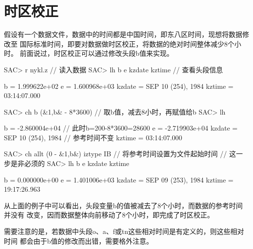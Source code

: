 \section{时区校正}
\label{sec:time-zone-correction}
假设有一个数据文件，数据中的时间都是中国时间，即东八区时间，现想将数据修改至
国际标准时间，即要对数据做时区校正，将数据的绝对时间整体减少8个小时。
前面说过，时区校正可以通过修改头段b值来实现。

\begin{SACCode}
SAC> r nykl.z                           // 读入数据
SAC> lh b e kzdate kztime               // 查看头段信息

          b = 1.999622e+02
          e = 1.600968e+03
     kzdate = SEP 10 (254), 1984
     kztime = 03:14:07.000

SAC> ch b (&1,b& - 8*3600)              // 取b值，减去8小时，再赋值给b
SAC> lh

          b = -2.860004e+04             // 此时b=200-8*3600=28600
          e = -2.719903e+04
     kzdate = SEP 10 (254), 1984        // 参考时间不变
     kztime = 03:14:07.000

SAC> ch allt (0 - &1,b&) iztype IB      // 将参考时间设置为文件起始时间
                                        // 这一步是非必须的
SAC> lh b e kzdate kztime

          b = 0.000000e+00
          e = 1.401006e+03
     kzdate = SEP 09 (253), 1984
     kztime = 19:17:26.963
\end{SACCode}

从上面的例子中可以看出，头段变量b的值被减去了8个小时，而数据的参考时间并没有
改变，因而数据整体向前移动了8个小时，即完成了时区校正。

需要注意的是，若数据中头段o、a、f或tn这些相对时间是有定义的，则这些相对时间
都会由于b值的修改而出错，需要格外注意。
